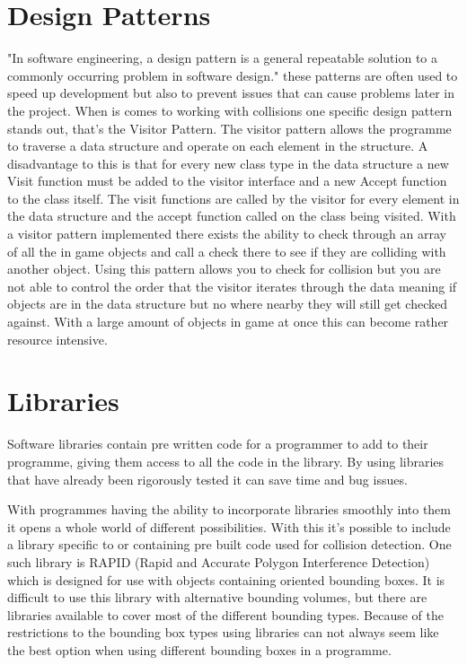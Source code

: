 \documentclass{scrartcl}
\begin{document}
	\section{Design Patterns}
	"In software engineering, a design pattern is a general repeatable solution to a commonly occurring problem in software design." \cite{designpatternsandrefactoring_2018} these patterns are often used to speed up development but also to prevent issues that can cause problems later in the project. When is comes to working with collisions one specific design pattern stands out, that's the Visitor Pattern\cite{gamma1995design}. The visitor pattern allows the programme to traverse a data structure and operate on each element in the structure. A disadvantage to this is that for every new class type in the data structure a new Visit function must be added to the visitor interface and a new Accept function to the class itself\cite{horsfall2012verifying}. The visit functions are called by the visitor for every element in the data structure and the accept function called on the class being visited. With a visitor pattern implemented there exists the ability to check through an array of all the in game objects and call a check there to see if they are colliding with another object. Using this pattern allows you to check for collision but you are not able to control the order that the visitor iterates through the data\cite{horsfall2012verifying} meaning if objects are in the data structure but no where nearby they will still get checked against. With a large amount of objects in game at once this can become rather resource intensive.
	
	\section{Libraries}
	Software libraries contain pre written code for a programmer to add to their programme, giving them access to all the code in the library. By using libraries that have already been rigorously tested it can save time and bug issues.
	
	With programmes having the ability to incorporate libraries smoothly into them it opens a whole world of different possibilities\cite{kula2017exploratory}. With this it's possible to include a library specific to or containing pre built code used for collision detection. One such library is RAPID (Rapid and Accurate Polygon Interference Detection)\cite{gottschalk1996obbtree} which is designed for use with objects containing oriented bounding boxes. It is difficult to use this library with alternative bounding volumes, but there are libraries available to cover most of the different bounding types. Because of the restrictions to the bounding box types using libraries can not always seem like the best option when using different bounding boxes in a programme.
	
\end{document}
